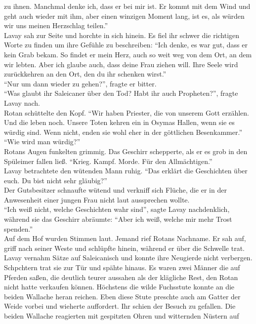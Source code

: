zu ihnen. Manchmal denke ich, dass er bei mir ist. Er kommt mit dem Wind und geht auch wieder 
mit ihm, aber einen winzigen Moment lang, ist es, als würden wir uns meinen Herzschlag teilen.''\\
Lavay sah zur Seite und horchte in sich hinein. Es fiel ihr schwer die richtigen Worte zu finden um 
ihre Gefühle zu beschreiben: ``Ich denke, es war gut, dass er kein Grab bekam. So findet er mein 
Herz, auch so weit weg von dem Ort, an dem wir lebten. Aber ich glaube auch, dass deine Frau ziehen 
will. Ihre Seele wird zurückkehren an den Ort, den du ihr schenken wirst.''\\
``Nur um dann wieder zu gehen?'', fragte er bitter.\\
``Was glaubt ihr Saleicaner über den Tod? Habt ihr auch Propheten?'', fragte Lavay nach.\\
Rotan schüttelte den Kopf. ``Wir haben Priester, die von unserem Gott erzählen. Und die leben noch. 
Unsere Toten kehren ein in Osymas Hallen, wenn sie es würdig sind. Wenn nicht, enden sie wohl eher 
in der göttlichen Besenkammer.''\\
``Wie wird man würdig?''\\
Rotans Augen funkelten grimmig. Das Geschirr schepperte, als er es grob in den Spüleimer fallen 
ließ. ``Krieg. Kampf. Morde. Für den Allmächtigen.''\\
Lavay betrachtete den wütenden Mann ruhig. ``Das erklärt die Geschichten über euch. Du bist nicht 
sehr gläubig?''\\
Der Gutsbesitzer schnaufte wütend und verkniff sich Flüche, die er in der Anwesenheit einer jungen 
Frau nicht laut aussprechen wollte.\\
``Ich weiß nicht, welche Geschichten wahr sind'', sagte Lavay nachdenklich, während sie das 
Geschirr abräumte: ``Aber ich weiß, welche mir mehr Trost spenden.''\\
Auf dem Hof wurden Stimmen laut. Jemand rief Rotans Nachname. Er sah auf, griff nach seiner Weste 
und schlüpfte hinein, während er über die Schwelle trat. Lavay vernahm Sätze auf Saleicanisch und 
konnte ihre Neugierde nicht verbergen. Schpchtern trat sie zur Tür und spähte hinaus. Es waren zwei 
Männer die auf Pferden saßen, die deutlich teurer aussahen als der klägliche Rest, den Rotan nicht 
hatte verkaufen können. Höchstens die wilde Fuchsstute konnte an die beiden Wallache heran reichen. 
Eben diese Stute preschte auch am Gatter der Weide vorbei und wieherte auffordert. Ihr schien der 
Besuch zu gefallen. Die beiden Wallache reagierten mit gespitzten Ohren und witternden Nüstern auf 

